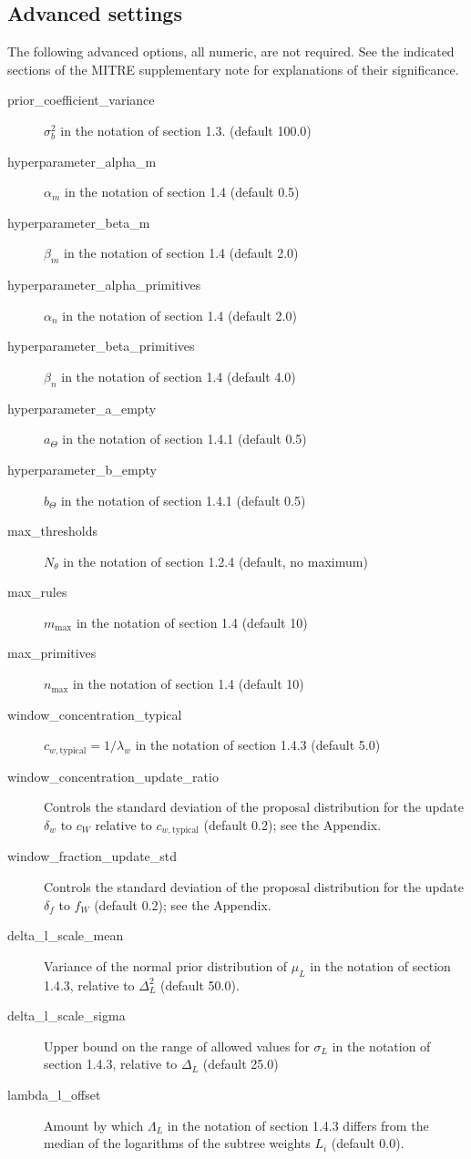 \documentclass[12pt]{report}
\begin{document}
\subsection{Advanced settings}
The following advanced options, all numeric, are not required. See the
indicated sections of the MITRE
supplementary note for explanations of their significance.
\begin{description}
\item[prior\_coefficient\_variance] $\sigma_b^2$ in the notation of
  section 1.3. (default 100.0)
\item[hyperparameter\_alpha\_m] $\alpha_m$ in the notation of section 1.4 (default 0.5)
\item[hyperparameter\_beta\_m] $\beta_m$ in the notation of section 1.4 (default 2.0)
\item[hyperparameter\_alpha\_primitives] $\alpha_n$ in the notation of section 1.4 (default 2.0)
\item[hyperparameter\_beta\_primitives] $\beta_n$ in the notation of section 1.4 (default 4.0)
\item[hyperparameter\_a\_empty] $a_\Theta$ in the notation of section
  1.4.1 (default 0.5)
\item[hyperparameter\_b\_empty] $b_\Theta$ in the notation of section
  1.4.1 (default 0.5)
\item[max\_thresholds] $N_\theta$ in the notation of section 1.2.4
  (default, no maximum)
\item[max\_rules] $m_\text{max}$ in the notation of section 1.4 (default 10)
\item[max\_primitives] $n_\text{max}$ in the notation of section 1.4 (default 10)
\item[window\_concentration\_typical]
  $c_{w,\text{typical}}=1/\lambda_w$ in the notation of section 1.4.3
  (default 5.0)
\item[window\_concentration\_update\_ratio] Controls the
  standard deviation of the proposal distribution for the
  update $\delta_w$ to $c_W$ relative to $c_{w,\text{typical}}$
  (default 0.2); see the Appendix.
\item[window\_fraction\_update\_std] Controls the
  standard deviation of the proposal distribution for the
  update $\delta_f$ to $f_W$ (default 0.2); see the Appendix.
\item[delta\_l\_scale\_mean] Variance of the normal
  prior distribution of $\mu_L$ in the notation of section 1.4.3, relative
  to $\Delta_L^2$ (default 50.0).
\item[delta\_l\_scale\_sigma] Upper bound on the range of allowed
  values for $\sigma_L$ in the notation of section 1.4.3, relative to
  $\Delta_L$ (default 25.0)
\item[lambda\_l\_offset] Amount by which $\Lambda_L$ in the notation
  of section 1.4.3 differs from the median of the logarithms of the
  subtree weights $L_i$ (default 0.0).
\end{description}
\end{document}
